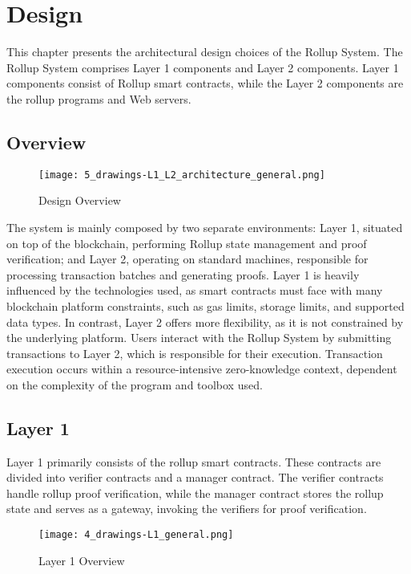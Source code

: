 \chapter{Design\label{cha:chapter5}}
This chapter presents the architectural design choices of the Rollup System. The Rollup System comprises Layer 1 components and Layer 2 components. Layer 1 components consist of Rollup smart contracts, while the Layer 2 components are the rollup programs and Web servers.

\section{Overview}
\begin{figure}[htb]
  \centering
  \texttt{[image: 5\_drawings-L1\_L2\_architecture\_general.png]}
  \caption{Design Overview}
  \label{fig:5_drawings-L1_L2_architecture_general}
\end{figure}

The system is mainly composed by two separate environments: Layer 1, situated on top of the blockchain, performing Rollup state management and proof verification; and Layer 2, operating on standard machines, responsible for processing transaction batches and generating proofs. Layer 1 is heavily influenced by the technologies used, as smart contracts must face with many blockchain platform constraints, such as gas limits, storage limits, and supported data types. In contrast, Layer 2 offers more flexibility, as it is not constrained by the underlying platform. Users interact with the Rollup System by submitting transactions to Layer 2, which is responsible for their execution. Transaction execution occurs within a resource-intensive zero-knowledge context, dependent on the complexity of the program and toolbox used.

\section{Layer 1\label{sec:designLayer1}}
Layer 1 primarily consists of the rollup smart contracts. These contracts are divided into verifier contracts and a manager contract. The verifier contracts handle rollup proof verification, while the manager contract stores the rollup state and serves as a gateway, invoking the verifiers for proof verification.

\begin{figure}[htb]
  \centering
  \texttt{[image: 4\_drawings-L1\_general.png]}
  \caption{Layer 1 Overview}
  \label{fig:Layer1overview}
\end{figure}

